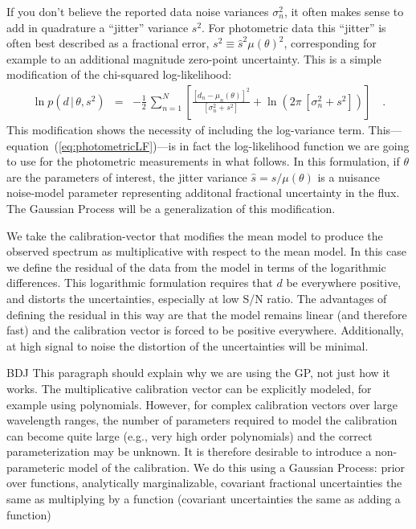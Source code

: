 \documentclass[iop,numberedappendix]{emulateapj}
\newcommand{\given}{\,|\,}
\begin{document}
If you don't believe the reported data noise variances $\sigma_n^2$,
it often makes sense to add in quadrature a ``jitter'' variance $s^2$.
For photometric data this ``jitter'' is often best described as a
fractional error, $s^2 \equiv \hat{s}^2\mu(\theta)^2$, corresponding
for example to an additional magnitude zero-point uncertainty.  This
is a simple modification of the chi-squared log-likelihood:
\begin{eqnarray}\label{eq:photometricLF}
\ln p(d\given\theta,s^2) &=& -\frac{1}{2}\,\sum_{n=1}^N
                             \left[\frac{[d_n - \mu_n(\theta)]^2}
                             {[\sigma_n^2 + s^2]} + 
                             \ln(2\pi\,[\sigma_n^2 + s^2]) \right]
\quad .
\end{eqnarray}
This modification shows the necessity of including the log-variance
term.
This---equation~(\ref{eq:photometricLF})---is in fact the
log-likelihood function we are going to use for the photometric
measurements in what follows.  In this formulation, if $\theta$ are
the parameters of interest, the jitter variance $\hat{s} = 
s/\mu(\theta)$ is a nuisance noise-model parameter representing
additonal fractional uncertainty in the flux.  The Gaussian Process
will be a generalization of this modification.

We take the calibration-vector that modifies the mean model to produce
the observed spectrum as multiplicative with respect to the mean
model.  In this case we define the residual of the data from the model
in terms of the logarithmic differences.  This logarithmic formulation
requires that $d$ be everywhere positive, and distorts the
uncertainties, especially at low S/N ratio.  The advantages of
defining the residual in this way are that the model remains linear
(and therefore fast) and the calibration vector is forced to be
positive everywhere.  Additionally, at high signal to noise the
distortion of the uncertainties will be minimal.

{\color{blue} BDJ This paragraph should explain why we are using the
GP, not just how it works.}
The multiplicative calibration vector can be explicitly modeled, for
example using polynomials.  However, for complex calibration vectors
over large wavelength ranges, the number of parameters required to
model the calibration can become quite large (e.g., very high order
polynomials) and the correct parameterization may be unknown.  It is
therefore desirable to introduce a non-parameteric model of the
calibration.  We do this using a Gaussian Process: prior over
functions, analytically marginalizable, covariant fractional
uncertainties the same as multiplying by a function (covariant
uncertainties the same as adding a function)
\end{document}
